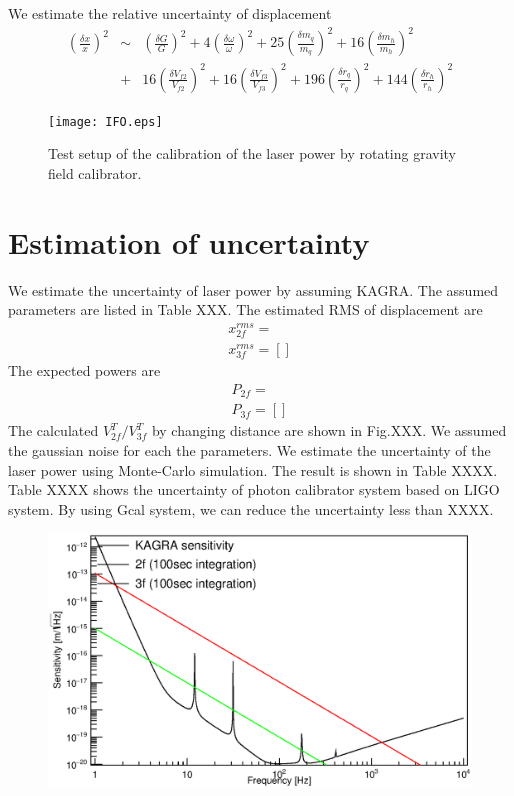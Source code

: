 \documentclass[12pt]{iopart}
\begin{document}
We estimate the  relative uncertainty of  displacement
\begin{eqnarray}
\left( \frac{\delta x}{x} \right)^2 &\sim& \left( \frac{\delta G}{G} \right)^2 +4\left( \frac{\delta \omega}{\omega} \right)^2+ 25\left( \frac{\delta m_q}{m_q} \right)^2 +16\left( \frac{\delta m_h}{m_h} \right)^2 \\
&+&16\left( \frac{\delta V_{f2}}{V_{f2}} \right)^2+16\left( \frac{\delta V_{f3}}{V_{f3}} \right)^2+ 196\left( \frac{\delta r_q}{r_q} \right)^2 +144\left( \frac{\delta r_h}{r_h} \right)^2 
\end{eqnarray}
\begin{figure}
\begin{center}
\texttt{[image: IFO.eps]}
\caption{Test setup of the calibration of the laser power by rotating gravity field calibrator.}
\label{fig:IFO}
\end{center}
\end{figure}

\section{Estimation of uncertainty}
We estimate the uncertainty of laser power by assuming KAGRA. The assumed parameters are listed in Table XXX. The estimated RMS of displacement are 
\begin{eqnarray}
x^{rms}_{2f}=\\
x^{rms}_{3f}= []
\end{eqnarray}
The expected powers are
\begin{eqnarray}
P_{2f}=\\
P_{3f}= []
\end{eqnarray}
The calculated $V^T_{2f}/V^{T}_{3f}$ by changing distance are shown in Fig.XXX.
We assumed the gaussian noise for each the parameters. We estimate the uncertainty of the laser power using Monte-Carlo simulation. The result is shown in Table XXXX. Table XXXX shows the uncertainty of  photon calibrator system based on LIGO system. By using Gcal system, we can reduce the uncertainty less than XXXX.
\begin{figure}
\begin{center}
\includegraphics[width=12cm]{peaks.eps}
\caption{}
\label{fig:peaks}
\end{center}
\end{figure}
\end{document}
